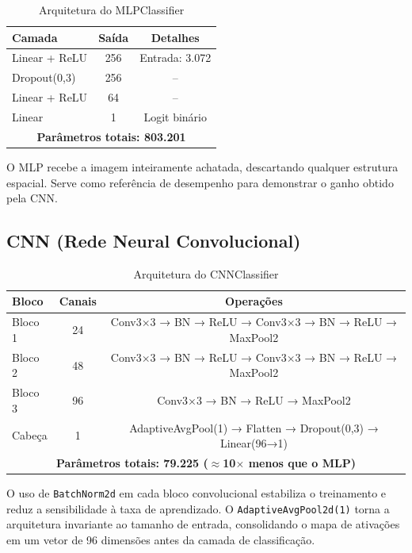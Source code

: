 \documentclass[conference]{IEEEtran}
\begin{document}
\begin{table}[H]
\centering
\caption{Arquitetura do MLPClassifier}
\label{tab:mlp}
\footnotesize
\begin{tabularx}{\columnwidth}{lcc}
\toprule
\textbf{Camada} & \textbf{Saída} & \textbf{Detalhes} \\
\midrule
Linear + ReLU & 256 & Entrada: 3.072 \\
Dropout(0,3) & 256 & -- \\
Linear + ReLU & 64 & -- \\
Linear & 1 & Logit binário \\
\midrule
\multicolumn{3}{c}{\textbf{Parâmetros totais: 803.201}} \\
\bottomrule
\end{tabularx}
\end{table}

O MLP recebe a imagem inteiramente achatada, descartando qualquer
estrutura espacial. Serve como referência de desempenho para demonstrar
o ganho obtido pela CNN.

\subsection{CNN (Rede Neural Convolucional)}

\begin{table}[H]
\centering
\caption{Arquitetura do CNNClassifier}
\label{tab:cnn}
\footnotesize
\begin{tabularx}{\columnwidth}{lcc}
\toprule
\textbf{Bloco} & \textbf{Canais} & \textbf{Operações} \\
\midrule
Bloco 1 & 24 & Conv3×3 → BN → ReLU → Conv3×3 → BN → ReLU → MaxPool2 \\
Bloco 2 & 48 & Conv3×3 → BN → ReLU → Conv3×3 → BN → ReLU → MaxPool2 \\
Bloco 3 & 96 & Conv3×3 → BN → ReLU → MaxPool2 \\
Cabeça  & 1  & AdaptiveAvgPool(1) → Flatten → Dropout(0,3) → Linear(96→1) \\
\midrule
\multicolumn{3}{c}{\textbf{Parâmetros totais: 79.225 ($\approx$10$\times$ menos que o MLP)}} \\
\bottomrule
\end{tabularx}
\end{table}

O uso de \texttt{BatchNorm2d} em cada bloco convolucional estabiliza o
treinamento e reduz a sensibilidade à taxa de aprendizado. O
\texttt{AdaptiveAvgPool2d(1)} torna a arquitetura invariante ao tamanho
de entrada, consolidando o mapa de ativações em um vetor de 96
dimensões antes da camada de classificação.
\end{document}
